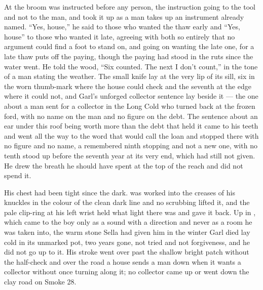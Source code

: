 At  the broom was instructed before any person, the instruction going to the tool and not to the man, and  took it up as a man takes up an instrument already named. “Yes, house,” he said to those who wanted the thaw early and “Yes, house” to those who wanted it late, agreeing with both so entirely that no argument could find a foot to stand on, and going on wanting the late one, for a late thaw puts off the paying, though the paying had stood in the ruts since the water went. He told the wood, “Six counted. The next I don't count,” in the tone of a man stating the weather. The small knife lay at the very lip of its sill, six in the worn thumb-mark where the house could check and the seventh at the edge where it could not, and Garl's unforged collector sentence lay beside it --- the one about a man sent for a collector in the Long Cold who turned back at the frozen ford, with no name on the man and no figure on the debt. The sentence about an ear under this roof being worth more than the debt that held it came to his teeth and went all the way to the word that would call the loan and stopped there with no figure and no name, a remembered ninth stopping and not a new one, with no tenth stood up before the seventh year at its very end, which had still not given. He drew the breath he should have spent at the top of the reach and did not spend it.

His chest had been tight since the dark.  was worked into the creases of his knuckles in the colour of the clean dark line and no scrubbing lifted it, and the pale clip-ring at his left wrist held what light there was and gave it back. Up in , which came to the boy only as a sound with a direction and never as a room he was taken into, the warm stone Sella had given him in the winter Garl died lay cold in its unmarked pot, two years gone, not tried and not forgiveness, and he did not go up to it. His stroke went over  past the shallow bright patch without the half-check and over the road a house sends a man down when it wants a collector without once turning along it; no collector came up or went down the clay road on Smoke 28.

